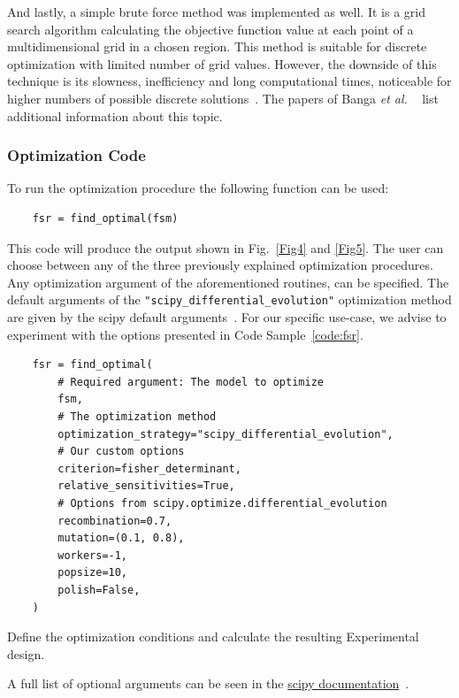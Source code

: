 \documentclass[graybox]{svmult}
\newcommand{\etal}{{\textit{et al. }}}
\begin{document}
And lastly, a simple brute force method was implemented as well.
It is a grid search algorithm calculating the objective function value at each point of a multidimensional grid in a chosen region.
This method is suitable for discrete optimization with limited number of grid values.
However, the downside of this technique is its slowness, inefficiency and long computational times, noticeable for higher numbers of possible discrete solutions~\cite{scipybrute}.
The papers of Banga \etal~\cite{banga_global_1996, banga_dynamic_2005, bangaImprovingFoodProcessing2003} list additional information about this topic.
%
\subsubsection{Optimization Code}
To run the optimization procedure the following function can be used:
\begin{verbatim}
    fsr = find_optimal(fsm)
\end{verbatim}
This code will produce the output shown in Fig.~\ref{Fig4} and \ref{Fig5}.
The user can choose between any of the three previously explained optimization procedures.
Any optimization argument of the aforementioned routines, can be specified.
The default arguments of the \texttt{"scipy_differential_evolution"} optimization method are given by the scipy default arguments~\cite{scipydiffev}.
For our specific use-case, we advise to experiment with the options presented in Code Sample~\ref{code:fsr}.
\begin{code}[h]
    \begin{verbatim}
    fsr = find_optimal(
        # Required argument: The model to optimize
        fsm,
        # The optimization method
        optimization_strategy="scipy_differential_evolution",
        # Our custom options
        criterion=fisher_determinant,
        relative_sensitivities=True,
        # Options from scipy.optimize.differential_evolution
        recombination=0.7,
        mutation=(0.1, 0.8),
        workers=-1,
        popsize=10,
        polish=False,
    )
    \end{verbatim}
    \caption{Define the optimization conditions and calculate the resulting Experimental design.}
    \label{code:fsr}
\end{code}
A full list of optional arguments can be seen in the \href{https://docs.scipy.org/doc/scipy/reference/optimize.html#global-optimization}{scipy documentation}~\cite{virtanenSciPyFundamentalAlgorithms2020}.
\end{document}
